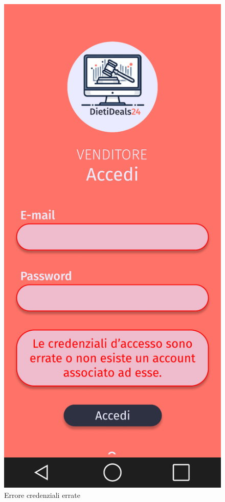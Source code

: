 \begin{figure}[!htb]
\begin{minipage}{0.32\textwidth}
            \includegraphics[width=.7\linewidth]{Immagini/Frames/Errori/E1.pdf}
            \caption{Errore credenziali errate}
        \end{minipage}\hfill
        \begin{minipage}{0.32\textwidth}
            \centering

\end{minipage}
\end{figure}
